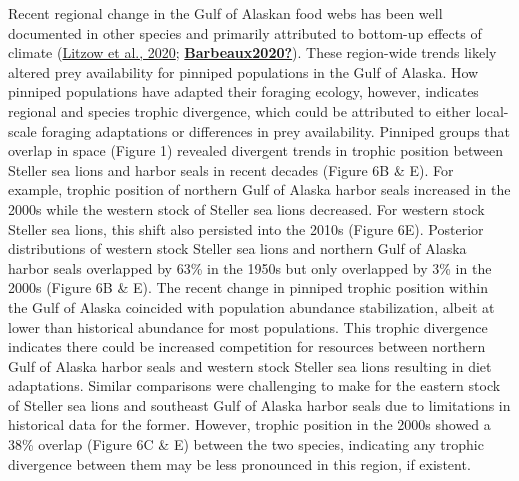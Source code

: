 \documentclass [11pt, proquest] {uwthesis}[2015/03/03]
\begin{document}
Recent regional change in the Gulf of Alaskan food webs has been well documented in other species and primarily attributed to bottom-up effects of climate (\protect\hyperlink{ref-Litzow2020}{Litzow et al., 2020}; \protect\hyperlink{ref-Barbeaux2020}{\textbf{Barbeaux2020?}}). These region-wide trends likely altered prey availability for pinniped populations in the Gulf of Alaska. How pinniped populations have adapted their foraging ecology, however, indicates regional and species trophic divergence, which could be attributed to either local-scale foraging adaptations or differences in prey availability. Pinniped groups that overlap in space (Figure 1) revealed divergent trends in trophic position between Steller sea lions and harbor seals in recent decades (Figure 6B \& E). For example, trophic position of northern Gulf of Alaska harbor seals increased in the 2000s while the western stock of Steller sea lions decreased. For western stock Steller sea lions, this shift also persisted into the 2010s (Figure 6E). Posterior distributions of western stock Steller sea lions and northern Gulf of Alaska harbor seals overlapped by 63\% in the 1950s but only overlapped by 3\% in the 2000s (Figure 6B \& E). The recent change in pinniped trophic position within the Gulf of Alaska coincided with population abundance stabilization, albeit at lower than historical abundance for most populations. This trophic divergence indicates there could be increased competition for resources between northern Gulf of Alaska harbor seals and western stock Steller sea lions resulting in diet adaptations. Similar comparisons were challenging to make for the eastern stock of Steller sea lions and southeast Gulf of Alaska harbor seals due to limitations in historical data for the former. However, trophic position in the 2000s showed a 38\% overlap (Figure 6C \& E) between the two species, indicating any trophic divergence between them may be less pronounced in this region, if existent.
\end{document}
